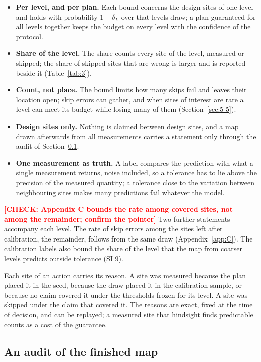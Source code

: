 \documentclass{iopjournal}
\providecommand{\tightlist}{\setlength{\itemsep}{0pt}\setlength{\parskip}{0pt}}
\newcommand{\ask}[1]{\textcolor{red}{\textbf{[#1]}}}
\begin{document}
\begin{itemize}
\tightlist
\item
  \textbf{Per level, and per plan.} Each bound concerns the design sites of one level and holds with probability \(1 - \delta_L\) over that level\textquotesingle s draw; a plan guaranteed for all levels together keeps the budget on every level with the confidence of the protocol.
\item
  \textbf{Share of the level.} The share counts every site of the level, measured or skipped; the share of skipped sites that are wrong is larger and is reported beside it (Table~\ref{tab:3}).
\item
  \textbf{Count, not place.} The bound limits how many skips fail and leaves their location open; skip errors can gather, and when sites of interest are rare a level can meet its budget while losing many of them (Section~\ref{sec:5-5}).
\item
  \textbf{Design sites only.} Nothing is claimed between design sites, and a map drawn afterwards from all measurements carries a statement only through the audit of Section~\ref{sec:3-6}.
\item
  \textbf{One measurement as truth.} A label compares the prediction with what a single measurement returns, noise included, so a tolerance has to lie above the precision of the measured quantity; a tolerance close to the variation between neighbouring sites makes many predictions fail whatever the model.
\end{itemize}

\ask{CHECK: Appendix C bounds the rate among covered sites, not among the remainder; confirm the pointer} Two further statements accompany each level. The rate of skip errors among the sites left after calibration, the remainder, follows from the same draw (Appendix~\ref{app:C}). The calibration labels also bound the share of the level that the map from coarser levels predicts outside tolerance (SI 9).

Each site of an action carries its reason. A site was measured because the plan placed it in the seed, because the draw placed it in the calibration sample, or because no claim covered it under the thresholds frozen for its level. A site was skipped under the claim that covered it. The reasons are exact, fixed at the time of decision, and can be replayed; a measured site that hindsight finds predictable counts as a cost of the guarantee.

\hypertarget{sec:3-6}{%
\subsection{An audit of the finished map}\label{sec:3-6}}
\end{document}
